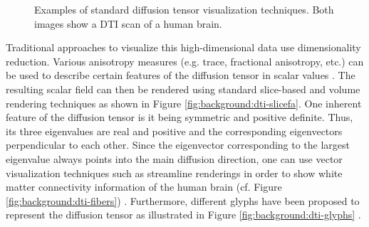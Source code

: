 \begin{figure}[ht]
	\centering
	\quad
	\caption{
		Examples of standard diffusion tensor visualization techniques. Both images show a DTI scan of a human brain.
	}
	\label{fig:background:dti-techniques}
\end{figure}

Traditional approaches to visualize this high-dimensional data use dimensionality reduction.
Various anisotropy measures (e.g. trace, fractional anisotropy, etc.) can be used to describe certain features of the diffusion tensor in scalar values \cite{Basser:2011:DTI, Westin:2002:DTMRI}.
The resulting scalar field can then be rendered using standard slice-based and volume rendering techniques as shown in Figure \ref{fig:background:dti-slicefa}.
One inherent feature of the diffusion tensor is it being symmetric and positive definite.
Thus, its three eigenvalues are real and positive and the corresponding eigenvectors perpendicular to each other.
Since the eigenvector corresponding to the largest eigenvalue always points into the main diffusion direction, one can use vector visualization techniques such as streamline renderings in order to show white matter connectivity information of the human brain (cf. Figure \ref{fig:background:dti-fibers}) \cite{Mori:2002:FiberTracking}.
Furthermore, different glyphs have been proposed to represent the diffusion tensor as illustrated in Figure \ref{fig:background:dti-glyphs} \cite{Westin:1999:DTI, Kindlman:2006:GlyphPacking}.

